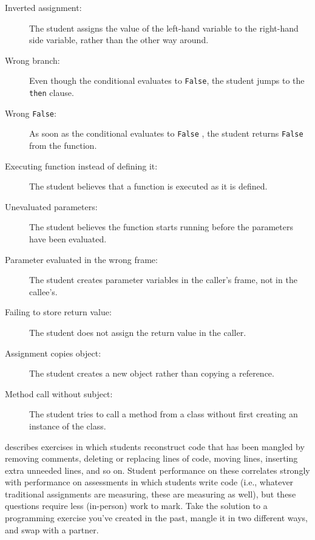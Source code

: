 \begin{description}

  \item[Inverted assignment:] The student assigns the value of the
    left-hand variable to the right-hand side variable, rather than
    the other way around.

  \item[Wrong branch:] Even though the conditional evaluates to
    \texttt{False}, the student jumps to the \texttt{then} clause.

  \item[Wrong \texttt{False}:] As soon as the conditional evaluates to
    \texttt{False} , the student returns \texttt{False} from the
    function.
  
  \item[Executing function instead of defining it:] The student
    believes that a function is executed as it is defined.

  \item[Unevaluated parameters:] The student believes the function
    starts running before the parameters have been evaluated.

  \item[Parameter evaluated in the wrong frame:] The student creates
    parameter variables in the caller's frame, not in the callee's.

  \item[Failing to store return value:] The student does not assign
    the return value in the caller.

  \item[Assignment copies object:] The student creates a new object
    rather than copying a reference.

  \item[Method call without subject:] The student tries to call a
    method from a class without first creating an instance of the
    class.

\end{description}


\cite{Chen2017} describes exercises in which students reconstruct code
that has been mangled by removing comments, deleting or replacing
lines of code, moving lines, inserting extra unneeded lines, and so
on.  Student performance on these correlates strongly with performance
on assessments in which students write code (i.e., whatever
traditional assignments are measuring, these are measuring as well),
but these questions require less (in-person) work to mark.  Take the
solution to a programming exercise you've created in the past, mangle
it in two different ways, and swap with a partner.

